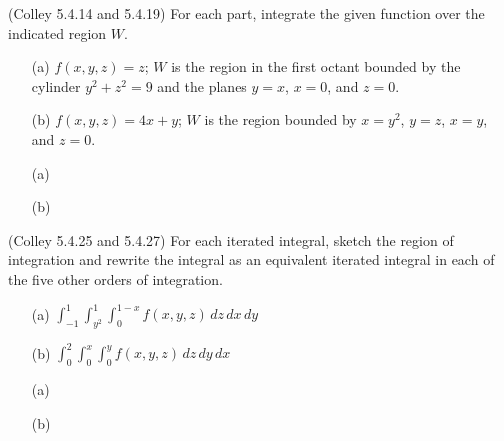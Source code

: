 \documentclass[11pt,letterpaper,cm]{nupset}
\begin{document}
\begin{problem}[Exercise 1] (Colley 5.4.14 and 5.4.19)  For each part, integrate the given function over the indicated region $W$.
	\begin{itemize}
		\item[(a)] $f(x,y,z)=z$; $W$ is the region in the first octant bounded by the cylinder $y^2+z^2=9$ and the planes $y=x$, $x=0$, and $z=0$.
		\item[(b)] $f(x,y,z)=4x+y$; $W$ is the region bounded by $x=y^2$, $y=z$, $x=y$, and $z=0$.
	\end{itemize}
\end{problem}
\begin{solution}
\begin{itemize}
	\item[(a)]
	\item[(b)]
\end{itemize}
\end{solution}
\newpage

\begin{problem}[Exercise 2] (Colley 5.4.25 and 5.4.27) For each iterated integral, sketch the region of integration and rewrite the integral as an equivalent iterated integral in each of the five other orders of integration.
	\begin{itemize}
		\item[(a)] $\displaystyle\int_{-1}^1 \int_{y^2}^1 \int_0^{1-x} f(x,y,z)\,dz\,dx\,dy$
		\item[(b)] $\displaystyle\int_0^2 \int_0^x \int_0^y f(x,y,z)\,dz\,dy\,dx$
	\end{itemize}
\end{problem}
\begin{solution}
	\begin{itemize}
		\item[(a)]
		\item[(b)]
	\end{itemize}
\end{solution}
\newpage
\end{document}
